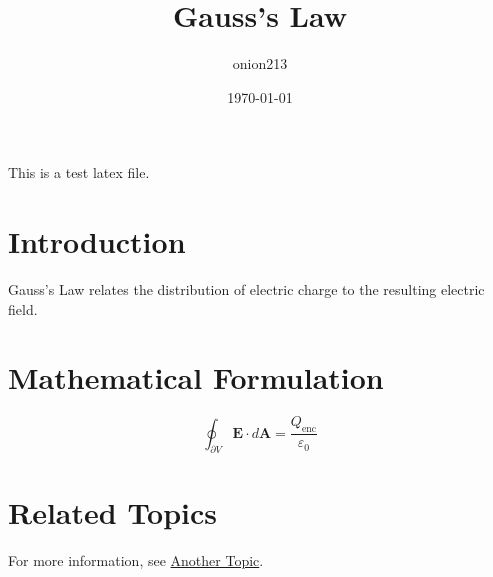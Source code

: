 \documentclass{article}
\title{Gauss's Law}
\author{onion213}
\date{\today}
\begin{document}
\maketitle

This is a test latex file.

\section{Introduction}

Gauss's Law relates the distribution of electric charge to the resulting electric field.

\section{Mathematical Formulation}

\begin{equation}
\oint_{\partial V} \mathbf{E} \cdot d\mathbf{A} = \frac{Q_{\text{enc}}}{\varepsilon_0}
\end{equation}

\section{Related Topics}

For more information, see \href{../another/file.tex}{Another Topic}.
\end{document}
